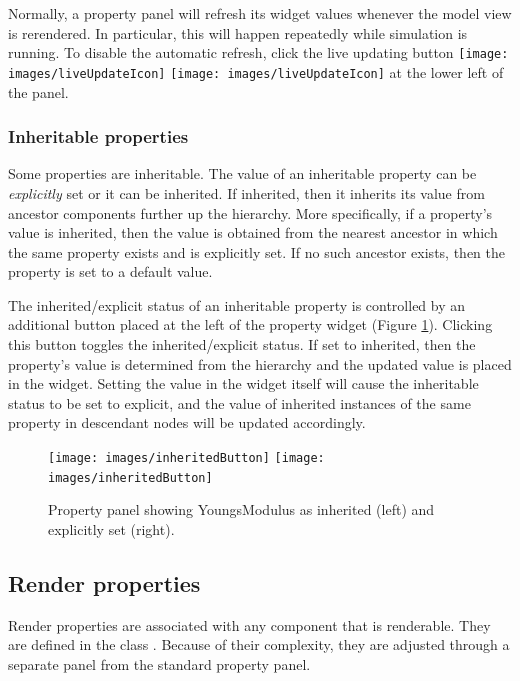 \documentclass{article}
\begin{document}
Normally, a property panel will refresh its widget values whenever the
model view is rerendered. In particular, this will happen repeatedly
while simulation is running. To disable the automatic refresh, click
the {\sf live updating} button 
\iflatexml
\texttt{[image: images/liveUpdateIcon]}
\else
\texttt{[image: images/liveUpdateIcon]}
\fi
at the lower
left of the panel.

\subsubsection{Inheritable properties}

Some properties are inheritable. The value of an inheritable property
can be {\it explicitly} set or it can be inherited.  If inherited, then it
inherits its value from ancestor components further up the hierarchy.
More specifically, if a property's value is inherited, then the value
is obtained from the nearest ancestor in which the same property
exists and is explicitly set.  If no such ancestor exists, then the
property is set to a default value.

The inherited/explicit status of an inheritable property is controlled
by an additional button placed at the left of the property widget
(Figure \ref{inheritedButtonFig}).  Clicking this button toggles the
inherited/explicit status.  If set to inherited, then the property's
value is determined from the hierarchy and the updated value is placed
in the widget.  Setting the value in the widget itself will cause the
inheritable status to be set to explicit, and the value of inherited
instances of the same property in descendant nodes will be updated
accordingly.

\begin{figure}
\begin{center}
\iflatexml
\texttt{[image: images/inheritedButton]}
\else
\texttt{[image: images/inheritedButton]}
\fi
\end{center}
\caption{Property panel showing YoungsModulus as inherited (left) and 
explicitly set (right).}%
\label{inheritedButtonFig}
\end{figure}

\subsection{Render properties}

Render properties are associated with any component that is
renderable. They are defined in the class 
. 
Because of their complexity, they are adjusted
through a separate panel from the standard property panel.
\end{document}
